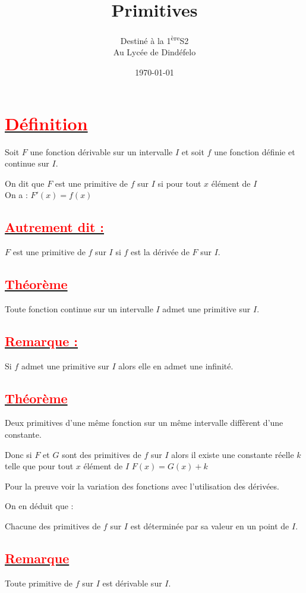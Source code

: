 \documentclass[12pt]{article}
\author{Destiné à la 1\textsuperscript{ère}S2\\Au Lycée de Dindéfelo}
\title{\textbf{Primitives}}
\date{\today}
\begin{document}
\maketitle
\newpage
\section*{\underline{\textbf{\textcolor{red}{Définition}}}}
Soit $F$ une fonction dérivable sur un intervalle $I$ et soit $f$ une fonction définie et continue sur $I$.

On dit que $F$ est une primitive de $f$ sur $I$ si pour tout $x$ élément de $I$\\
On a : $F'(x)=f(x)$
\subsection*{\underline{\textbf{\textcolor{red}{Autrement dit :}}}}
$F$ est une primitive de $f$ sur $I$ si $f$ est la dérivée de $F$ sur $I$.
\subsection*{\underline{\textbf{\textcolor{red}{Théorème}}}}
Toute fonction continue sur un intervalle $I$ admet une primitive sur $I$.
\subsection*{\underline{\textbf{\textcolor{red}{Remarque :}}}}
Si $f$ admet une primitive sur $I$ alors elle en admet une infinité.
\subsection*{\underline{\textbf{\textcolor{red}{Théorème}}}}
Deux primitives d'une même fonction sur un même intervalle diffèrent d'une constante.
 
Donc si $F$ et $G$ sont des primitives de $f$ sur $I$ alors il existe une constante réelle $k$ telle que pour tout $x$ élément de $I$ $F(x)=G(x)+k$

Pour la preuve voir la variation des fonctions avec l'utilisation des dérivées.
 
On en déduit que : 
 
Chacune des primitives de $f$ sur $I$ est déterminée par sa valeur en un point de $I$.
\subsection*{\underline{\textbf{\textcolor{red}{Remarque}}}}
Toute primitive de $f$ sur $I$ est dérivable sur $I$.
 
\end{document}
